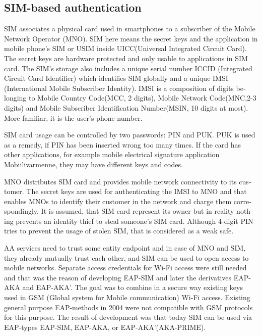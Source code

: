 \documentclass[12pt,a4paper,english]{tutthesis}
\begin{document}
\begin{otherlanguage}{english}
\section{SIM-based authentication}
\label{sec-2-5}
\label{sec:sim-based-auth}
SIM associates a physical card used in smartphones to
a subscriber of the Mobile Network Operator (MNO).
SIM here means the secret keys and the application in mobile phone's
SIM or USIM inside UICC(Universal Integrated Circuit Card).
The secret keys are hardware protected and only usable to applications
in SIM card.
The SIM's storage also includes a unique serial number ICCID 
(Integrated Circuit Card Identifier) which identifies SIM globally
and a unique IMSI (International Mobile Subscriber Identity). IMSI is
a composition of digits belonging to Mobile Country Code(MCC, 2
digits), Mobile Network Code(MNC,2-3 digits) and Mobile Subscriber
Identification Number(MSIN, 10 digits at most).
More familiar, it is the user's phone number.


SIM card usage can be controlled by two passwords: PIN and PUK.  PUK
is used as a remedy, if PIN has been inserted wrong too many times.
If the card has other applications, for example mobile electrical
signature application Mobiilivarmenne, they may have different keys
and codes.


MNO distributes SIM card and provides mobile network connectivity to
its customer.  The secret keys are used for authenticating the IMSI
to MNO and that enables MNOs to identify their customer in the network
and charge them correspondingly. It is assumed, that SIM card represent
its owner but in reality nothing prevents an identity thief to steal
someone's SIM card. Although 4-digit PIN tries to prevent the usage of 
stolen SIM, that is considered as a weak safe\cite[p.31]{aaa-nakhjiri2005}.


AA services need to trust some entity endpoint and in case of MNO and
SIM, they already mutually trust each other, and SIM can be used 
to open access to mobile networks.
Separate access credentials for Wi-Fi access were still needed
and that was the reason of developing EAP-SIM and later the
derivatives EAP-AKA and EAP-AKA'.  The goal was to combine in a secure
way existing keys used in  GSM (Global system for Mobile communication)
Wi-Fi access. Existing general purpose EAP-methods in 2004 were not
compatible with GSM protocols for this purpose.\cite[p.93]{hav-doc}
The result of development was that today SIM can be used via EAP-types EAP-SIM, EAP-AKA, or
EAP-AKA'(AKA-PRIME).


\end{otherlanguage}
\end{document}
